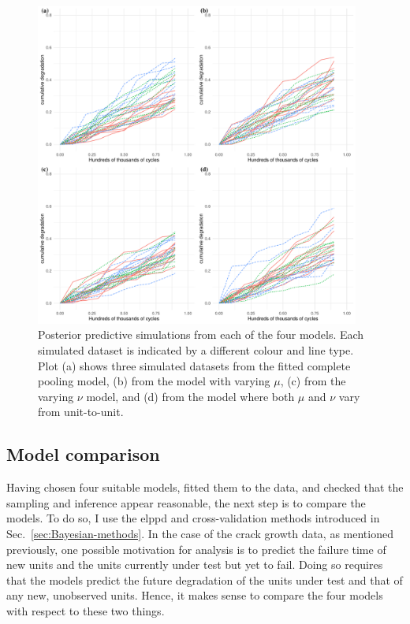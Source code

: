 \begin{figure}[tbp]
   \centering
   \includegraphics[width=0.95\textwidth]{./figures/ch-5/post_pc.pdf}
   \caption{Posterior predictive simulations from each of the four models. Each simulated dataset is indicated by a different colour and line type. Plot (a) shows three simulated datasets from the fitted complete pooling model, (b) from the model with varying $\mu$, (c) from the varying $\nu$ model, and (d) from the model where both $\mu$ and $\nu$ vary from unit-to-unit.}
   \label{fig:post-pc} 
\end{figure}

\subsection{Model comparison}
\label{subsec:modcomp}

Having chosen four suitable models, fitted them to the data, and checked that the sampling and inference appear reasonable, the next step is to compare the models. To do so, I use the elppd and cross-validation methods introduced in Sec.~\ref{sec:Bayesian-methods}. In the case of the crack growth data, as mentioned previously, one possible motivation for analysis is to predict the failure time of new units and the units currently under test but yet to fail. Doing so requires that the models predict the future degradation of the units under test and that of any new, unobserved units. Hence, it makes sense to compare the four models with respect to these two things.

